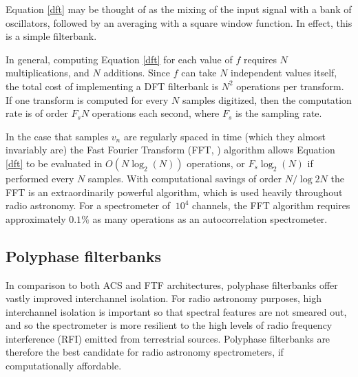 \documentclass{ws-rv961x669}
\begin{document}
Equation \ref{dft} may be thought of as the mixing of the input signal with a bank of oscillators, followed by an averaging with a square window function. In effect, this is a simple filterbank.

In general, computing Equation \ref{dft} for each value of $f$ requires $N$ multiplications, and $N$ additions. Since $f$ can take $N$ independent values itself, the total cost of implementing a DFT filterbank is $N^2$ operations per transform. If one transform is computed for every $N$ samples digitized, then the computation rate is of order $F_sN$ operations each second, where $F_s$ is the sampling rate.

In the case that samples $v_n$ are regularly spaced in time (which they almost invariably are) the Fast Fourier Transform (FFT, \cite{Cooley1965}) algorithm allows Equation \ref{dft} to be evaluated in $O(N\log_2(N))$ operations, or $F_s\log_2(N)$ if performed every $N$ samples. With computational savings of order $N / \log2{N}$ the FFT is an extraordinarily powerful algorithm, which is used heavily throughout radio astronomy. For a spectrometer of $~10^4$ channels, the FFT algorithm requires approximately $0.1\%$ as many operations as an autocorrelation spectrometer.







\subsection{Polyphase filterbanks}

In comparison to both ACS and FTF architectures, polyphase filterbanks offer vastly improved interchannel isolation. For radio astronomy
purposes, high interchannel isolation is important so that spectral features are not smeared out, and so the spectrometer is more resilient to the high levels of radio frequency interference (RFI) emitted from terrestrial sources. Polyphase filterbanks are therefore the best candidate for radio astronomy spectrometers, if computationally affordable.
\end{document}
